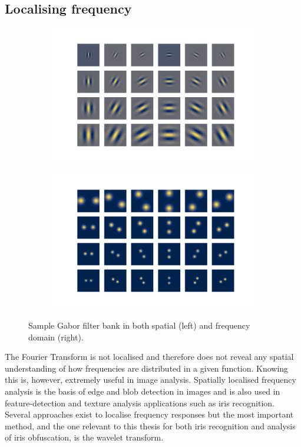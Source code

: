 \subsection{Localising frequency}
\begin{figure}
\begin{subfigure}{0.49\textwidth}
	\centering
	\includegraphics[width=1\textwidth]{figures/theory/gabor_sample}
\end{subfigure}
\begin{subfigure}{0.49\textwidth}
	\centering
	\includegraphics[width=1\textwidth]{figures/theory/gabor_sample_f}
\end{subfigure}
\caption{Sample Gabor filter bank in both spatial (left) and frequency domain (right).}\label{fig:gabor-sample}
\end{figure}

The Fourier Transform is not localised and therefore does not reveal any spatial understanding of how frequencies are distributed in a given function. Knowing this is, however, extremely useful in image analysis. Spatially localised frequency analysis is the basis of edge and blob detection in images and is also used in feature-detection and texture analysis applications such as iris recognition. Several approaches exist to localise frequency responses but the most important method, and the one relevant to this thesis for both iris recognition and analysis of iris obfuscation, is the wavelet transform.


